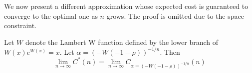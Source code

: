 We now present a different approximation whose expected cost is guaranteed
to converge to the optimal one as $n$ grows.  The proof is omitted due to
the space constraint.

\begin{theorem}\label{theorem:approx1}
Let $W$ denote the Lambert W function defined by the lower branch of $W(x) e^{W(x)} = x$.
Let $\alpha = (-W(-1-\rho))^{-1/n}$.  Then 
$$\lim_{n \rightarrow \infty} C^*(n) = \lim_{n \rightarrow \infty} C_{\alpha = (-W(-1-\rho))^{-1/n}}(n)$$
\end{theorem}





